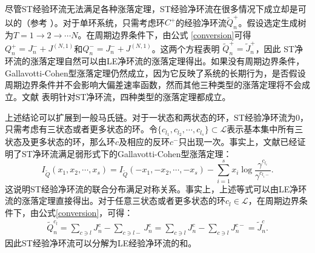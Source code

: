 尽管ST经验环流无法满足各种涨落定理，ST经验净环流在很多情况下成立却是可以的（参考 \cite{andrieux2007fluctuation}）。对于单环系统，只需考虑环$C^+$的经验净环流$\tilde{Q}^+_n$。假设选定生成树为$T = 1 \rightarrow 2 \rightarrow \cdots N$。在周期边界条件下，由公式 \ref{conversion}可得$Q_n^+=J_n^- + J^{(N,1)}$和$Q_n^-=J_n^- + J^{(N,1)}$。这两个方程表明 $\tilde{Q}_n^+ = \tilde{J}_n^+$，因此 ST净环流的涨落定理自然可以由LE净环流的涨落定理得出。如果没有周期边界条件，Gallavotti-Cohen型涨落定理仍然成立，因为它反映了系统的长期行为，是否假设周期边界条件并不会影响大偏差速率函数，然而其他三种类型的涨落定理将不会成立。文献\cite{polettini2014transient} 表明针对ST净环流，四种类型的涨落定理都成立。

上述结论可以扩展到一般马氏链。对于一状态和两状态的环，ST经验净环流为0，只需考虑有三状态或者更多状态的环。令$\{c_{l_1}, c_{l_2},\cdots, c_{l_s}\} \subset \mathcal{L}$表示基本集中所有三状态及更多状态的环，那么环$c$及相应的反环$c^-$只出现一次。事实上，文献\cite{andrieux2007fluctuation}已经证明了ST净环流满足弱形式下的Gallavotti-Cohen型涨落定理：
\begin{equation} \label{Gallavotti}
    I_{\tilde{Q}}(x_1,x_2,\cdots,x_s)
    = I_{\tilde{Q}}(-x_1,-x_2,\cdots,-x_s)
    -\sum_{i=1}^s x_i\log\frac{\gamma^{c_{l_i}}}{\gamma^{c_{l_{i}-}}}.
\end{equation}
这说明ST经验净环流的联合分布满足对称关系。事实上，上述等式可以由LE净环流的涨落定理直接得出。对于任意三状态或者更多状态的环$c_l \in \mathcal{L}$，在周期边界条件下，由公式\ref{conversion}，可得：
\begin{equation*}\label{circulation}
    \begin{split}
    \tilde{Q}^{c_l}_n =\sum_{c\ni l}J^c_n-\sum_{c\ni l-}J^c_n
    =\sum_{c\ni l}J^c_n-\sum_{c\ni l}J^{c-}_n = \tilde{J}^c_n.
    \end{split}
\end{equation*}
因此ST经验净环流可以分解为LE经验净环流的和。

